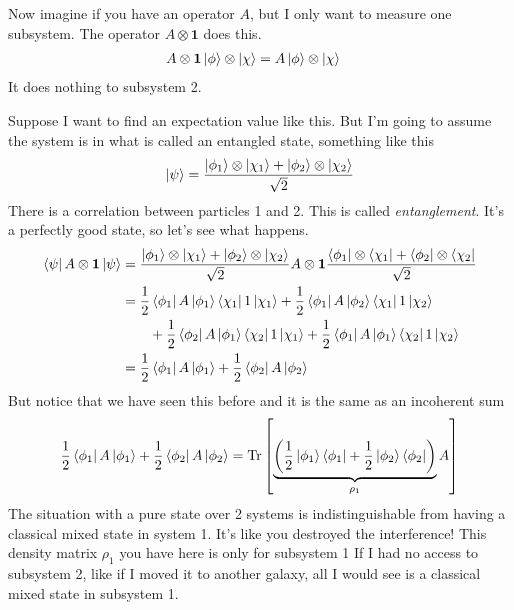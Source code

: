 Now imagine if you have an operator $A$,
but I only want to measure one subsystem.
The operator $A\otimes \mathbf{1}$ does this.
\begin{align}
    A\otimes \mathbf{1} \ket{\phi}\otimes\ket{\chi}
    &=
    A \ket{\phi} \otimes \ket{\chi}
\end{align}
It does nothing to subsystem 2.

Suppose I want to find an expectation value like this.
But I'm going to assume the system is in what is called an entangled state,
something like this
\begin{align}
    \ket{\psi} =
    \frac{%
        \ket{\phi_1}\otimes\ket{\chi_1}
        + \ket{\phi_2}\otimes\ket{\chi_2}
    }{\sqrt{2}}
\end{align}
There is a correlation between particles 1 and 2.
This is called \emph{entanglement}.
It's a perfectly good state,
so let's see what happens.
\begin{align}
    \bra{\psi} A\otimes\mathbf{1} \ket{\psi} &=
    \frac{%
        \ket{\phi_1}\otimes\ket{\chi_1}
        + \ket{\phi_2}\otimes\ket{\chi_2}
    }{\sqrt{2}}
    A\otimes\mathbf{1}
    \frac{%
        \bra{\phi_1}\otimes\bra{\chi_1}
        + \bra{\phi_2}\otimes\bra{\chi_2}
    }{\sqrt{2}}\\
    &=
    \frac{1}{2}
    \bra{\phi_1}A\ket{\phi_1}
    \bra{\chi_1}1\ket{\chi_1}
    +
    \frac{1}{2}
    \bra{\phi_1}A\ket{\phi_2}
    \bra{\chi_1}1\ket{\chi_2}\\\nonumber
    &\qquad+
    \frac{1}{2}
    \bra{\phi_2}A\ket{\phi_1}
    \bra{\chi_2}1\ket{\chi_1}
    +
    \frac{1}{2}
    \bra{\phi_1}A\ket{\phi_1}
    \bra{\chi_2}1\ket{\chi_2}\\
    &=
    \frac{1}{2}\bra{\phi_1}A\ket{\phi_1}
    + \frac{1}{2}\bra{\phi_2}A\ket{\phi_2}
\end{align}
But notice that we have seen this before and it is the same as an incoherent sum
\begin{align}
    \frac{1}{2}\bra{\phi_1}A\ket{\phi_1}
    + \frac{1}{2}\bra{\phi_2}A\ket{\phi_2}
    =\Tr\left[
        \underbrace{\left(
            \frac{1}{2}\ket{\phi_1}\bra{\phi_1}
            + \frac{1}{2}\ket{\phi_2}\bra{\phi_2}
        \right)}_{\rho_1} A
    \right]
\end{align}
The situation with a pure state over 2 systems is indistinguishable from having
a classical mixed state in system 1.
It's like you destroyed the interference!
This density matrix $\rho_1$ you have here is only for subsystem 1
If I had no access to subsystem 2,
like if I moved it to another galaxy,
all I would see is a classical mixed state in subsystem 1.

